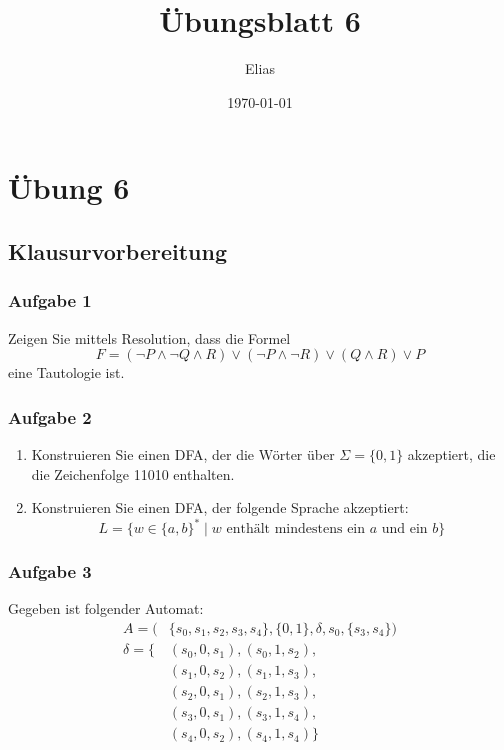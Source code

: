 \documentclass[a4paper,14pt,ngerman]{scrartcl}
\author{Elias}
\date{\today}
\title{Übungsblatt 6}
\begin{document}
\section{\textbf{Übung 6}}
\label{sec:orgbf5c516}
\subsection{\textbf{Klausurvorbereitung}}
\label{sec:org367ffbe}

\subsubsection{\textbf{Aufgabe 1}}
\label{sec:orgf55cf70}

Zeigen Sie mittels Resolution, dass die Formel
\[F=(\neg P \land \neg Q \land R) \lor (\neg P \land \neg R) \lor (Q \land R) \lor P\]
eine Tautologie ist.
\subsubsection{\textbf{Aufgabe 2}}
\label{sec:org4008a7b}

\begin{enumerate}
\item Konstruieren Sie einen DFA, der die Wörter über \(\Sigma=\{0,1\}\)
akzeptiert, die die Zeichenfolge 11010 enthalten.

\item Konstruieren Sie einen DFA, der folgende Sprache akzeptiert:
\[L=\{w \in \{a,b\}^* \mid w \textrm{ enthält mindestens ein $a$ und ein $b$}\}\]
\end{enumerate}
\subsubsection{\textbf{Aufgabe 3}}
\label{sec:orge5479f5}

Gegeben ist folgender Automat: \\
\[\begin{aligned}
        A=(&\{s_0, s_1, s_2, s_3, s_4\}, \{0,1\}, \delta, s_0, \{s_3, s_4\})\\
        \delta=\{&(s_0,0,s_1),(s_0,1,s_2),\\
                 &(s_1,0,s_2),(s_1,1,s_3),\\
                 &(s_2,0,s_1),(s_2,1,s_3),\\
                 &(s_3,0,s_1),(s_3,1,s_4),\\
                 &(s_4,0,s_2),(s_4,1,s_4)\}\\
\end{aligned}\]
\end{document}
